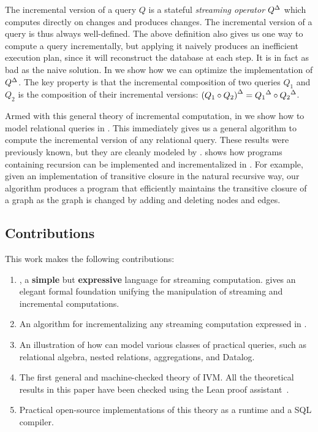 The incremental version of a query $Q$ is a stateful \emph{streaming
operator} ${Q}^{\Delta}$ which computes directly on changes and produces
changes.  The incremental version of a query is thus always
well-defined.  The above definition also gives us one way to compute a
query incrementally, but applying it naively produces an inefficient
execution plan, since it will reconstruct the database at each step.
It is in fact as bad as the naive solution.  In
 we show how we can optimize the
implementation of ${Q}^{\Delta}$. The key property is that the incremental
composition of two queries $Q_1$ and $Q_2$ is the composition of their
incremental versions: ${(Q_1 \circ Q_2)}^{\Delta} = {Q_1}^{\Delta} \circ
{Q_2}^{\Delta}$.

Armed with this general theory of incremental computation, in
 we show how to model relational queries in
\dbsp.  This immediately gives us a general algorithm to compute the
incremental version of any relational query.  These results were
previously known, but they are cleanly modeled by \dbsp.
 shows how programs containing recursion can be
implemented and incrementalized in \dbsp.  For example, given an
implementation of transitive closure in the natural recursive way, our
algorithm produces a program that efficiently maintains the transitive
closure of a graph as the graph is changed by adding and deleting
nodes and edges.

\subsection{Contributions}

This work makes the following contributions:
\begin{enumerate}
  \item \dbsp, a \textbf{simple} but \textbf{expressive} language for streaming
  computation. \dbsp gives an elegant formal foundation unifying the manipulation of
  streaming and incremental computations.
  \item An algorithm for incrementalizing any streaming computation expressed in
  \dbsp.
  \item An illustration of how \dbsp can model various classes of
    practical queries, such as relational algebra, nested relations,
    aggregations, and Datalog.
  \item The first general and machine-checked theory of IVM.  All the
    theoretical results in this paper have been checked using the Lean
    proof assistant~\cite{dbsp-theory}.
  \item Practical open-source implementations of this theory as a
    runtime and a SQL compiler.
\end{enumerate}

